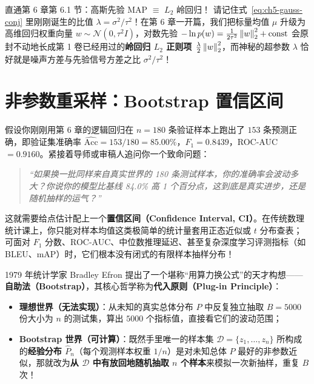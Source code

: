 \begin{insightBox}{直通第 6 章第 6.1 节：高斯先验 MAP $\equiv$ $L_2$ 岭回归！}
请记住式~\eqref{eq:ch5-gauss-conj} 里刚刚诞生的比值 $\lambda = \sigma^2 / \tau^2$！在第 6 章一开篇，我们把标量均值 $\mu$ 升级为高维回归权重向量 $w \sim \mathcal{N}(0, \tau^2 I)$，对数先验 $-\ln p(w) = \frac{1}{2\tau^2}\left\|w\right\|_2^2 + \text{const}$ 会原封不动地长成第 1 卷已经用过的\textbf{岭回归 $L_2$ 正则项 $\frac{\lambda}{2}\left\|w\right\|_2^2$}，而神秘的超参数 $\lambda$ 恰好就是噪声方差与先验信号方差之比 $\sigma^2/\tau^2$！
\end{insightBox}

\section{非参数重采样：Bootstrap 置信区间}
\label{sec:ch5-bootstrap}

假设你刚刚用第 6 章的逻辑回归在 $n=180$ 条验证样本上跑出了 $153$ 条预测正确，即验证集准确率 $\widehat{\text{Acc}} = 153/180 = \mathbf{85.00\%}$，$F_1 = 0.8439$，ROC-AUC $= 0.9160$。紧接着导师或审稿人追问你一个致命问题：
\begin{quote}
  \itshape “如果换一批同样来自真实世界的 180 条测试样本，你的准确率会波动多大？你说你的模型比基线 84.0\% 高 1 个百分点，这到底是真实进步，还是随机抽样的运气？”
\end{quote}

这就需要给点估计配上一个\textbf{置信区间（Confidence Interval, CI）}。在传统数理统计课上，你只能对样本均值这类极简单的统计量套用正态近似或 $t$ 分布查表；可面对 $F_1$ 分数、ROC-AUC、中位数推理延迟、甚至复杂深度学习评测指标（如 BLEU、mAP）时，它们根本没有闭式的有限样本抽样分布！

1979 年统计学家 Bradley Efron 提出了一个堪称“用算力换公式”的天才构想——\textbf{自助法（Bootstrap）}，其核心哲学称为\textbf{代入原则（Plug-in Principle）}：
\begin{itemize}
  \item \textbf{理想世界（无法实现）}：从未知的真实总体分布 $P$ 中反复独立抽取 $B=5000$ 份大小为 $n$ 的测试集，算出 $5000$ 个指标值，直接看它们的波动范围；
  \item \textbf{Bootstrap 世界（可计算）}：既然手里唯一的样本集 $\mathcal{D} = \{z_1, \dots, z_n\}$ 所构成的\textbf{经验分布 $\hat{P}_n$}（每个观测样本权重 $1/n$）是对未知总体 $P$ 最好的非参数近似，那就改为\textbf{从 $\mathcal{D}$ 中有放回地随机抽取 $n$ 个样本}来模拟一次新抽样，重复 $B$ 次！
\end{itemize}

